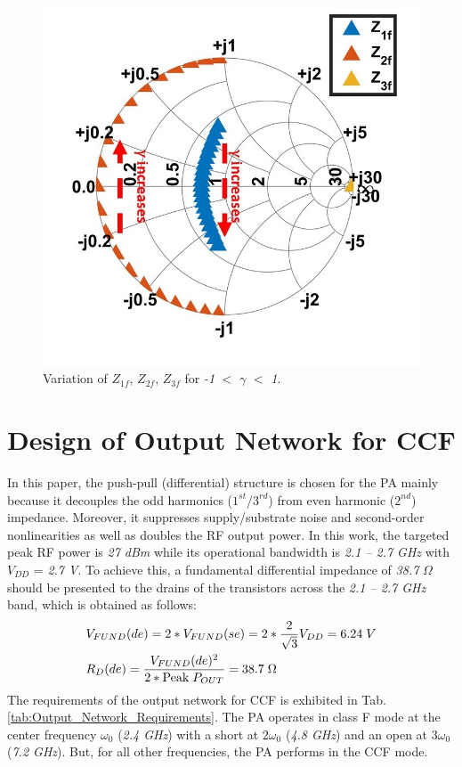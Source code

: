 \documentclass[conference]{IEEEtran}
\begin{document}
\begin{figure}[!t]
\centering
\captionsetup{font=footnotesize}
\includegraphics[width=0.63\linewidth]{Images/CCF/CCF_SC.jpg}
\caption{Variation of $Z_{1f}$, $Z_{2f}$, $Z_{3f}$ for \textit{-1} $<$ $\gamma$ $<$ \textit{1}.}
\label{fig:CCF_SC}
\vspace{-0.05in}
\end{figure}
 

\section{Design of Output Network for CCF}
\label{section:ON}
In this paper, the push-pull (differential) structure is chosen for the PA mainly because it decouples the odd harmonics ($1^{st}$/$3^{rd}$) from even harmonic ($2^{nd}$) impedance. Moreover, it suppresses supply/substrate noise and second-order nonlinearities as well as doubles the RF output power. 
In this work, the targeted peak RF power is \textit{27 dBm}  while its operational bandwidth is \textit{2.1 -- 2.7 GHz} with $V_{DD}$ = \textit{2.7 V}. To achieve this, a  fundamental differential impedance of \textit{38.7} $\Omega$ should be presented to the drains of the transistors across the \textit{2.1 -- 2.7 GHz} band, which is obtained as follows:
\vspace{-0.05in}
\begin{equation}
\begin{aligned}
&V_{FUND}(de)=2*V_{FUND}(se)=2*\frac{2}{\sqrt{3}} V_{DD}=6.24 \hspace{1mm}V\\
&R_{D}(de)=\frac{V_{FUND}(de)^{2}}{2*\text{Peak} \hspace{1mm} P_{OUT}}=38.7 \hspace{1mm} \Omega
\label{eqn_diff_imp}
\end{aligned}
\end{equation}
The requirements of the output network for CCF is exhibited in Tab. \ref{tab:Output_Network_Requirements}. The PA operates in class F mode at the center frequency $\omega_0$ (\textit{2.4 GHz}) with a short at $2\omega_0$ (\textit{4.8 GHz}) and an open at $3\omega_0$ (\textit{7.2 GHz}). But, for all other frequencies, the PA performs in the CCF mode. 
\end{document}
